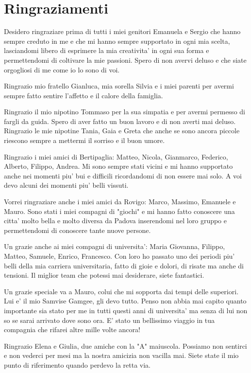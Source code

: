 \thispagestyle{empty}

\section{Ringraziamenti}
Desidero ringraziare prima di tutti i miei genitori Emanuela e Sergio che hanno sempre creduto in me e che mi hanno sempre supportato in ogni mia scelta, lasciandomi libero di esprimere la mia creativita' in ogni sua forma e permettendomi di coltivare la mie passioni. Spero di non avervi deluso e che siate orgogliosi di me come io lo sono di voi.

Ringrazio mio fratello Gianluca, mia sorella Silvia e i miei parenti per avermi sempre fatto sentire l'affetto e il calore della famiglia.

Ringrazio il mio nipotino Tommaso per la sua simpatia e per avermi permesso di fargli da guida. Spero di aver fatto un buon lavoro e di non averti mai deluso. Ringrazio le mie nipotine Tania, Gaia e Greta che anche se sono ancora piccole riescono sempre a mettermi il sorriso e il buon umore.

Ringrazio i miei amici di Bertipaglia: Matteo, Nicola, Gianmarco, Federico, Alberto, Filippo, Andrea. Mi sono sempre stati vicini e mi hanno supportato anche nei momenti piu' bui e difficili ricordandomi di non essere mai solo. A voi devo alcuni dei momenti piu' belli vissuti.

Vorrei ringraziare anche i miei amici da Rovigo: Marco, Massimo, Emanuele e Mauro. Sono stati i miei compagni di "giochi" e mi hanno fatto conoscere una citta' molto bella e molto diversa da Padova inserendomi nel loro gruppo e permettendomi di conoscere tante nuove persone.

Un grazie anche ai miei compagni di universita': Maria Giovanna, Filippo, Matteo, Samuele, Enrico, Francesco. Con loro ho passato uno dei periodi piu' belli della mia carriera universitaria, fatto di gioie e dolori, di risate ma anche di tensioni. Il miglior team che potessi mai desiderare, siete fantastici.

Un grazie speciale va a Mauro, colui che mi sopporta dai tempi delle superiori. Lui e' il mio Samvise Gamgee, gli devo tutto. Penso non abbia mai capito quanto importante sia stato per me in tutti questi anni di universita' ma senza di lui non so se sarai arrivato dove sono ora. E' stato un bellissimo viaggio in tua compagnia che rifarei altre mille volte ancora!

Ringrazio Elena e Giulia, due amiche con la "A" maiuscola. Possiamo non sentirci e non vederci per mesi ma la nostra amicizia non vacilla mai. Siete state il mio punto di riferimento quando perdevo la retta via.

